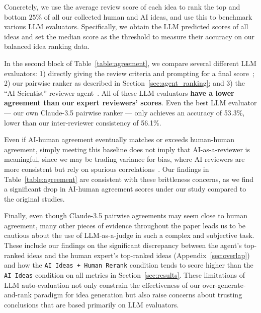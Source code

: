 Concretely, we use the average review score of each idea to rank the top and bottom $25\%$ of all our collected human and AI ideas, 
and use this to benchmark various LLM evaluators. Specifically, we obtain the LLM predicted scores of all ideas and set the median score as the threshold to measure their accuracy on our balanced idea ranking data. 

In the second block of Table~\ref{table:agreement}, we compare several different LLM evaluators: 1) directly giving the review criteria and prompting for a final score~\cite{Yang2023LargeLM,Li2024MLRCopilotAM,Baek2024ResearchAgentIR}; 2) our pairwise ranker as described in Section~\ref{sec:agent_ranking}; and 3) the ``AI Scientist'' reviewer agent~\cite{AIScientist}. All of these LLM evaluators \textbf{have a lower agreement than our expert reviewers' scores}. Even the best LLM evaluator --- our own Claude-3.5 pairwise ranker --- only achieves an accuracy of 53.3\%, lower than our inter-reviewer consistency of 56.1\%. 

Even if AI-human agreement eventually matches or exceeds human-human agreement, simply meeting this baseline does not imply that AI-as-a-reviewer is meaningful, since we may be trading variance for bias, where AI reviewers are more consistent but rely on spurious correlations~\cite{Durmus2022SpuriousCI}. Our findings in Table~\ref{table:agreement} are consistent with these brittleness concerns, as we find a significant drop in AI-human agreement scores under our study compared to the original studies.

Finally, even though Claude-3.5 pairwise agreements may seem close to human agreement, many other pieces of evidence throughout the paper leads us to be cautious about the use of LLM-as-a-judge in such a complex and subjective task. These include our findings on the significant discrepancy between the agent's top-ranked ideas and the human expert's top-ranked ideas (Appendix~\ref{sec:overlap}) and how the \texttt{AI Ideas + Human Rerank} condition tends to score higher than the \texttt{AI Ideas} condition on all metrics in Section~\ref{sec:results}. 
These limitations of LLM auto-evaluation not only constrain the effectiveness of our over-generate-and-rank paradigm for idea generation but also raise concerns about trusting conclusions that are based primarily on LLM evaluators.

